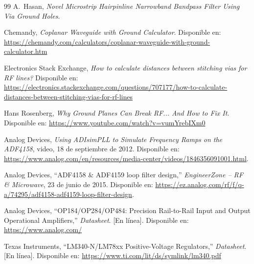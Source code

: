 \begin{thebibliography}{99}
A.~Hasan,
\emph{Novel Microstrip Hairpinline Narrowband Bandpass Filter Using Via Ground Holes}.

Chemandy,
\emph{Coplanar Waveguide with Ground Calculator}.
Disponible en:
\url{https://chemandy.com/calculators/coplanar-waveguide-with-ground-calculator.htm}

Electronics Stack Exchange,
\emph{How to calculate distances between stitching vias for RF lines?}
Disponible en:
\url{https://electronics.stackexchange.com/questions/707177/how-to-calculate-distances-between-stitching-vias-for-rf-lines}

Hans Rosenberg,
\emph{Why Ground Planes Can Break RF... And How to Fix It}.
Disponible en:
\url{https://www.youtube.com/watch?v=vumYrebIXm0}

Analog Devices,
\emph{Using ADIsimPLL to Simulate Frequency Ramps on the ADF4158},
video, 18 de septiembre de 2012.
Disponible en:
\url{https://www.analog.com/en/resources/media-center/videos/1846356091001.html}.

Analog Devices,
``ADF4158 \& ADF4159 loop filter design,''
\emph{EngineerZone -- RF \& Microwave},
23 de junio de 2015.
Disponible en:
\url{https://ez.analog.com/rf/f/q-a/74295/adf4158-adf4159-loop-filter-design}.

Analog Devices,
``OP184/OP284/OP484: Precision Rail-to-Rail Input and Output Operational Amplifiers,''
\emph{Datasheet}. [En línea].
Disponible en:
\url{https://www.analog.com/}

Texas Instruments,
``LM340-N/LM78xx Positive-Voltage Regulators,''
\emph{Datasheet}. [En línea].
Disponible en:
\url{https://www.ti.com/lit/ds/symlink/lm340.pdf}

\end{thebibliography}